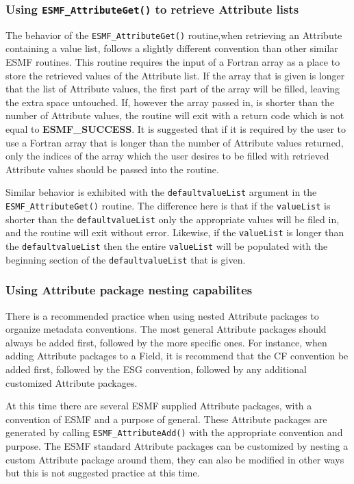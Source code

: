 \subsubsection{Using {\tt ESMF\_AttributeGet()} to retrieve Attribute lists}

The behavior of the {\tt ESMF\_AttributeGet()} routine,when retrieving an Attribute containing a value list, follows a slightly different convention than other similar ESMF routines.  This routine requires the input of a Fortran array as a place to store the retrieved values of the Attribute list.  If the array that is given is longer that the list of Attribute values, the first part of the array will be filled, leaving the extra space untouched.  If, however the array passed in, is shorter than the number of Attribute values, the routine will exit with a return code which is not equal to {\bf ESMF\_SUCCESS}.  It is suggested that if it is required by the user to use a Fortran array that is longer than the number of Attribute values returned, only the indices of the array which the user desires to be filled with retrieved Attribute values should be passed into the routine.  
  
Similar behavior is exhibited with the {\tt defaultvalueList} argument in the {\tt ESMF\_AttributeGet()} routine.  The difference here is that if the {\tt valueList} is shorter than the {\tt defaultvalueList} only the appropriate values will be filed in, and the routine will exit without error.  Likewise, if the {\tt valueList} is longer than the {\tt defaultvalueList} then the entire {\tt valueList} will be populated with the beginning section of the {\tt defaultvalueList} that is given.  

\subsubsection{Using Attribute package nesting capabilites}

There is a recommended practice when using nested Attribute packages to organize metadata conventions.  The most general Attribute packages should always be added first, followed by the more specific ones.  For instance, when adding Attribute packages to a Field, it is recommend that the CF convention be added first, followed by the ESG convention, followed by any additional customized Attribute packages.  

At this time there are several ESMF supplied Attribute packages, with a convention of ESMF and a purpose of general.  These Attribute packages are generated by calling {\tt ESMF\_AttributeAdd()} with the appropriate convention and purpose.  The ESMF standard Attribute packages can be customized by nesting a custom Attribute package around them, they can also be modified in other ways but this is not suggested practice at this time.

